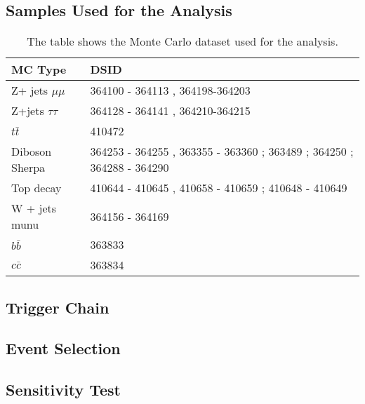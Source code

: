 \subsection{Samples Used for the Analysis}

\begin{table}[!htb]
    \begin{center}
    \caption{
        The table shows the Monte Carlo dataset used for the analysis. 
    }
\label{tab:MC samples}
\begin{tabular}{|l|l|}
\hline
\textbf{MC Type}   & \textbf{DSID}                                                         \\ \hline
Z+ jets $\mu\mu$   & 364100 - 364113 , 364198-364203                                       \\ \hline
Z+jets $\tau \tau$ & 364128 - 364141 , 364210-364215                                       \\ \hline
$t\bar{t}$         & 410472                                                                \\ \hline
Diboson Sherpa     & 364253 - 364255 , 363355 - 363360 ; 363489 ; 364250 ; 364288 - 364290 \\ \hline
Top decay          & 410644 - 410645 , 410658 - 410659 ; 410648 - 410649                   \\ \hline
W + jets munu      & 364156 - 364169                                                       \\ \hline
$b\bar{b}$         & 363833                                                                \\ \hline
$c\bar{c}$         & 363834                                                                \\ \hline
\end{tabular}
\end{center}
\end{table}

\subsection{Trigger Chain}

\subsection{Event Selection}

\subsection{Sensitivity Test}

